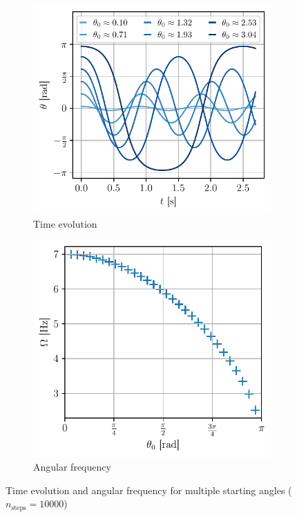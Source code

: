 \begin{figure}[H]
    \centering
    \begin{subfigure}{0.48\linewidth}
        \centering
        \includegraphics[width=\linewidth]{figures/oscillations_trajectory.pdf}
        \caption{Time evolution}
        \label{fig:oscillations_time}
    \end{subfigure}
    \begin{subfigure}{0.48\linewidth}
        \centering
        \includegraphics[width=\linewidth]{figures/angular_frequency.pdf}
        \caption{Angular frequency}
        \label{fig:angular_frequency}
    \end{subfigure}
    \caption{Time evolution and angular frequency for multiple starting angles (\(n_\textrm{steps}=10000\))}
\end{figure}


